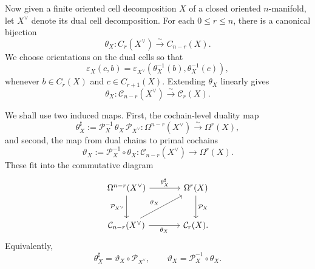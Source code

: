 Now given a finite oriented cell decomposition  \(X\) of a closed oriented
\(n\)-manifold, let \(X^\vee\) denote its dual cell decomposition.
For each \(0\le r\le n\), there is a canonical bijection
\begin{equation}
	\theta_X:C_r(X^\vee)\xrightarrow{\sim} C_{n-r}(X).
	\label{eq:theta}
\end{equation}
We choose orientations on the dual cells so that
\begin{equation}
	\varepsilon_X(c,b)
	=
	\varepsilon_{X^\vee}\left(\theta_X^{-1}(b),\theta_X^{-1}(c)\right),
	\label{eq:dual-incidence}
\end{equation}
whenever \(b\in C_r(X)\) and \(c\in C_{r+1}(X)\). Extending \(\theta_X\) linearly gives
\begin{equation}
	\theta_X:\mathcal C_{n-r}(X^\vee)\xrightarrow{\sim}\mathcal C_r(X).
	\label{eq:theta-linear}
\end{equation}

We shall use two induced maps. First, the cochain-level duality map
\begin{equation}
	\theta_X^\sharp
	:=
	\mathcal P_X^{-1}\,\theta_X\,\mathcal P_{X^\vee}
	:
	\Omega^{n-r}(X^\vee)\xrightarrow{\sim}\Omega^r(X),
	\label{eq:theta-sharp}
\end{equation}
and second, the map from dual chains to primal cochains
\begin{equation}
	\vartheta_X
	:=
	\mathcal P_X^{-1}\circ \theta_X
	:
	\mathcal C_{n-r}(X^\vee)\to \Omega^r(X).
	\label{eq:vartheta}
\end{equation}
These fit into the commutative diagram
\begin{equation}
	\begin{tikzcd}[column sep=large,row sep=large]
		\Omega^{n-r}(X^\vee)
		\arrow[r,"\theta_X^\sharp"]
		\arrow[d,"\mathcal P_{X^\vee}"']
		&
		\Omega^r(X)
		\arrow[d,"\mathcal P_X"]
		\\
		\mathcal C_{n-r}(X^\vee)
		\arrow[r,"\theta_X"']
		\arrow[ur,"\vartheta_X"]
		&
		\mathcal C_r(X).
	\end{tikzcd}
	\label{eq:structural-diagram}
\end{equation}
Equivalently,
\begin{equation}
	\theta_X^\sharp=\vartheta_X\circ \mathcal P_{X^\vee},
	\qquad
	\vartheta_X=\mathcal P_X^{-1}\circ \theta_X.
\end{equation}

